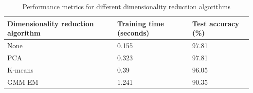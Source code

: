 \documentclass[letterpaper]{article}
\begin{document}
	\begin{table}[]
		\centering
		\caption{Performance metrics for different dimensionality reduction algorithms}
		\label{tab:nn}
		\begin{tabular}{@{}lll@{}}
			\toprule
			\textbf{Dimensionality reduction algorithm} & \textbf{Training time (seconds)} & \textbf{Test accuracy (\%)} \\ \midrule
			None & 0.155 & 97.81 \\ \midrule
			PCA & 0.323 & 97.81 \\ \midrule
			K-means & 0.39 & 96.05 \\ \midrule
			GMM-EM & 1.241 & 90.35 \\ \bottomrule
		\end{tabular}
	\end{table}

	
	
	
\end{document}
